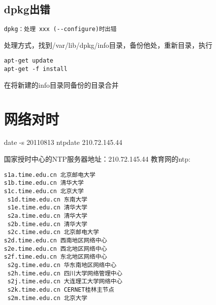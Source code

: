 \subsection{dpkg出错}
\label{err:dpkgConfig}
\begin{verbatim}
dpkg：处理 xxx (--configure)时出错
\end{verbatim}
处理方式，找到/var/lib/dpkg/info目录，备份他处，重新目录，执行
\begin{verbatim}
apt-get update
apt-get -f install
\end{verbatim}
在将新建的info目录同备份的目录合并





















\section{网络对时}
\begin{shellcmd}
date -s 20110813
ntpdate 210.72.145.44
\end{shellcmd}

国家授时中心的NTP服务器地址：210.72.145.44
教育网的ntp:
\begin{verbatim}
s1a.time.edu.cn 北京邮电大学
s1b.time.edu.cn 清华大学
s1c.time.edu.cn 北京大学
 s1d.time.edu.cn 东南大学
 s1e.time.edu.cn 清华大学
 s2a.time.edu.cn 清华大学
 s2b.time.edu.cn 清华大学
 s2c.time.edu.cn 北京邮电大学
s2d.time.edu.cn 西南地区网络中心
s2e.time.edu.cn 西北地区网络中心
s2f.time.edu.cn 东北地区网络中心
 s2g.time.edu.cn 华东南地区网络中心
 s2h.time.edu.cn 四川大学网络管理中心
 s2j.time.edu.cn 大连理工大学网络中心
 s2k.time.edu.cn CERNET桂林主节点
 s2m.time.edu.cn 北京大学
\end{verbatim}
